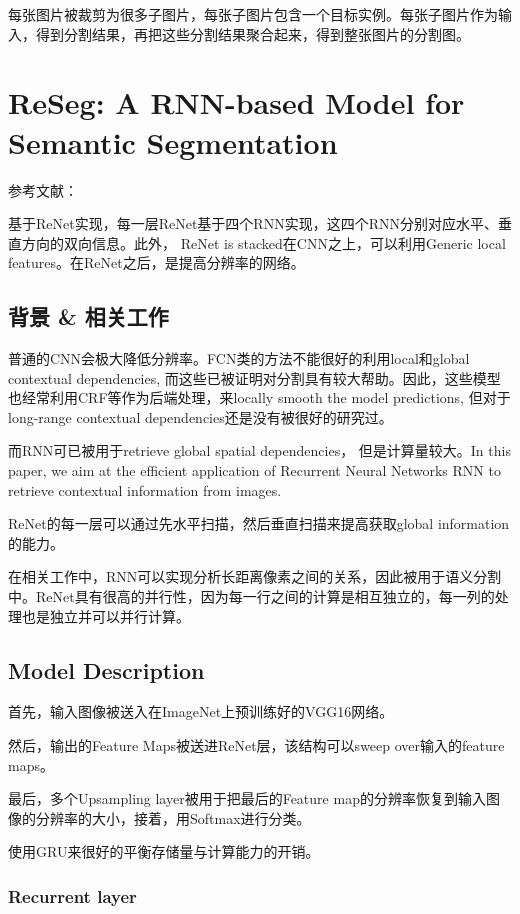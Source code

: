 每张图片被裁剪为很多子图片，每张子图片包含一个目标实例。每张子图片作为输入，得到分割结果，再把这些分割结果聚合起来，得到整张图片的分割图。

\section[ReSeg 2015]{ReSeg: A RNN-based Model for Semantic Segmentation}

参考文献：\cite{ReSeg2015}

基于ReNet实现，每一层ReNet基于四个RNN实现，这四个RNN分别对应水平、垂直方向的双向信息。此外， ReNet is stacked在CNN之上，可以利用Generic local features。在ReNet之后，是提高分辨率的网络。

\subsection{背景 \& 相关工作}

普通的CNN会极大降低分辨率。FCN类的方法不能很好的利用local和global contextual dependencies, 而这些已被证明对分割具有较大帮助。因此，这些模型也经常利用CRF等作为后端处理，来locally smooth the model predictions, 但对于long-range contextual dependencies还是没有被很好的研究过。

而RNN可已被用于retrieve global spatial dependencies， 但是计算量较大。In this paper, we aim at the efficient application of Recurrent Neural Networks RNN to retrieve contextual information from images.

ReNet的每一层可以通过先水平扫描，然后垂直扫描来提高获取global information的能力。

在相关工作中，RNN可以实现分析长距离像素之间的关系，因此被用于语义分割中。ReNet具有很高的并行性，因为每一行之间的计算是相互独立的，每一列的处理也是独立并可以并行计算。

\subsection{Model Description}

首先，输入图像被送入在ImageNet上预训练好的VGG16网络。

然后，输出的Feature Maps被送进ReNet层，该结构可以sweep over输入的feature maps。

最后，多个Upsampling layer被用于把最后的Feature map的分辨率恢复到输入图像的分辨率的大小，接着，用Softmax进行分类。

使用GRU来很好的平衡存储量与计算能力的开销。

\subsubsection{Recurrent layer}


